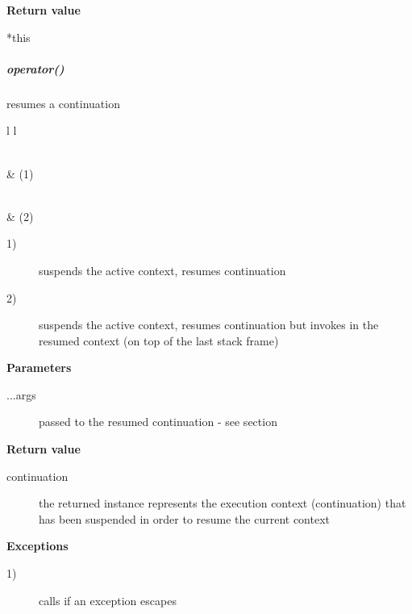 {\bfseries Return value}
\begin{description}
    \item[*this]
\end{description}


\subparagraph*{operator()}
resumes a continuation\\

\begin{tabular}{ l l }
    \midrule

    \\
     & (1)\\

    \midrule

    \\
     & (2)\\

    \midrule
\end{tabular}

\begin{description}
    \item[1)] suspends the active context, resumes continuation 
    \item[2)] suspends the active context, resumes continuation  but
              invokes  in the resumed context (on top of the
              last stack frame)
\end{description}

{\bfseries Parameters}
\begin{description}
    \item[...args] passed to the resumed continuation - see section
                   \\
\end{description}

{\bfseries Return value}
\begin{description}
    \item[continuation] the returned instance represents the execution context
                        (continuation) that has been suspended in order to
                        resume the current context
\end{description}

{\bfseries Exceptions}
\begin{description}
    \item[1)] calls  if an exception escapes \entryfn\ 
              \\
\end{description}

